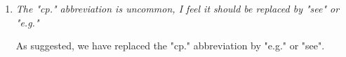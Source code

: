 \documentclass[a4paper,12pt]{article}
\begin{document}
\begin{enumerate}[label=(\arabic*),leftmargin=0.7cm]
\item \textit{The "cp." abbreviation is uncommon, I feel it should be replaced by "see" or "e.g."}

As suggested, we have replaced the "cp." abbreviation by "e.g." or "see".
 

\end{enumerate}



\newpage

{\small
\setlength{\bibsep}{0.45em}
}
\end{document}
